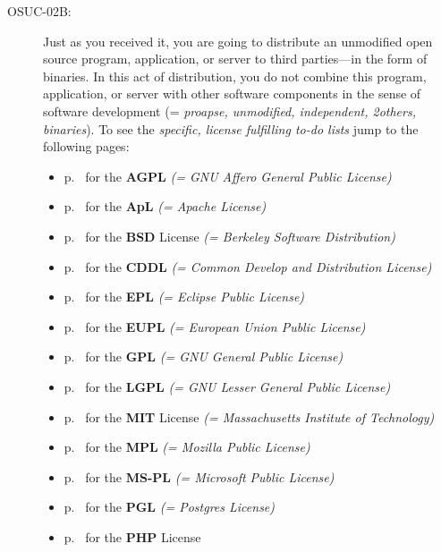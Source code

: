 \begin{description}
\item[OSUC-02B:]\label{OSUC-02B-DEF} Just as you received it, you are going to
distribute an unmodified open source program, application, or server to third
parties---in the form of binaries. In this act of distribution, you do not
combine this program, application, or server with other software components in
the sense of software development (= \textit{proapse, unmodified, independent,
2others, binaries}). To see the \textit{specific, license fulfilling to-do
lists} jump to the following pages:
   \begin{itemize}
    \item p.\ \pageref{OSUC-02B-AGPL} for the \textbf{AGPL}
      \textit{(= GNU Affero General Public License)} 
    \item p.\ \pageref{OSUC-02B-Apache20} for the \textbf{ApL}
      \textit{(= Apache License)}
    \item p.\ \pageref{OSUC-02B-BSD} for the \textbf{BSD} License
      \textit{(= Berkeley Software Distribution)}
    \item p.\ \pageref{OSUC-02B-CDDL} for the \textbf{CDDL}
      \textit{(= Common Develop and Distribution License)}  
    \item p.\ \pageref{OSUC-02B-EPL} for the \textbf{EPL}
      \textit{(= Eclipse Public License)}     
    \item p.\ \pageref{OSUC-02B-EUPL} for the \textbf{EUPL}
      \textit{(= European Union Public License)} 
    \item p.\ \pageref{OSUC-02B-GPL} for the \textbf{GPL}
       \textit{(= GNU General Public License)} 
    \item p.\ \pageref{OSUC-02B-LGPL} for the \textbf{LGPL}
      \textit{(= GNU Lesser General Public License)}           
    \item p.\ \pageref{OSUC-02B-MIT} for the \textbf{MIT} License
       \textit{(= Massachusetts Institute of Technology)} 
    \item p.\ \pageref{OSUC-02B-MPL} for the \textbf{MPL}
      \textit{(= Mozilla Public License)}     
    \item p.\ \pageref{OSUC-02B-MS-PL} for the \textbf{MS-PL}
      \textit{(= Microsoft Public License)} 
    \item p.\ \pageref{OSUC-02B-PGL} for the \textbf{PGL}
      \textit{(= Postgres License)} 
    \item p.\ \pageref{OSUC-02B-PHP} for the \textbf{PHP} License 
  \end{itemize}
  

\end{description}
